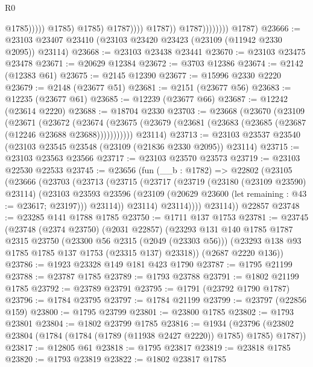 \begin{lexlean}{R0}
\begin{coremodule}
                                                @1785)))))
                                      @1785)
                                    @1785)
                                  @1787))))
                          @1787))
                      @1787))))))))
      @1787)
@23666 := @23103 @23407 @23410 (@23103 @23420 @23423 (@23109 (@11942 @2330 @2095)) @23114)
@23668 := @23103 @23438 @23441
@23670 := @23103 @23475 @23478
@23671 := @20629 @12384
@23672 := @3703 @12386
@23674 := @2142 (@12383 @61)
@23675 := @2145 @12390
@23677 := @15996 @2330 @2220
@23679 := @2148 (@23677 @51)
@23681 := @2151 (@23677 @56)
@23683 := @12235 (@23677 @61)
@23685 := @12239 (@23677 @66)
@23687 := @12242 (@23614 @2220)
@23688 := @18704 @2330
@23703 := @23668
    (@23670
      (@23109
        (@23671
          (@23672
            (@23674 (@23675 (@23679 (@23681 (@23683 (@23685 (@23687 (@12246 @23688 @23688)))))))))))
      @23114)
@23713 := @23103 @23537 @23540 (@23103 @23545 @23548 (@23109 (@21836 @2330 @2095)) @23114)
@23715 := @23103 @23563 @23566
@23717 := @23103 @23570 @23573
@23719 := @23103 @22530 @22533
@23745 := @23656
    (fun (__b : @1782) =>
    @22802
      (@23105
        (@23666
          (@23703
            (@23713
              (@23715
                (@23717
                  (@23719
                    (@23180 (@23109 @23590) @23114)
                    (@23103
                      @23593
                      @23596
                      (@23109 (@20629 @23600 (let remaining : @43 := @23617; @23197)))
                      @23114))
                  @23114)
                @23114))))
        @23114))
    @22857
@23748 := @23285 @141 @1788 @1785
@23750 := @1711 @137 @1753
@23781 := @23745
    (@23748
      (@2374 @23750)
      (@2031 @22857)
      (@23293
        @131
        @140
        @1785
        @1787
        @2315
        @23750
        (@23300 @56 @2315 (@2049 (@23303 @56)))
        (@23293 @138 @93 @1785 @1785 @137 @1753 (@23315 @137) @23318))
      (@2687 @2220 @136))
@23786 := @1923 @23328 @149 @181 @423 @1790
@23787 := @1795 @21199
@23788 := @23787 @1785
@23789 := @1793 @23788
@23791 := @1802 @21199 @1785
@23792 := @23789 @23791
@23795 := @1791 (@23792 @1790 @1787)
@23796 := @1784 @23795
@23797 := @1784 @21199
@23799 := @23797 (@22856 @159)
@23800 := @1795 @23799
@23801 := @23800 @1785
@23802 := @1793 @23801
@23804 := @1802 @23799 @1785
@23816 := @1934
    (@23796 (@23802 @23804 (@1784 (@1784 (@1789 (@11938 @2427 @2220)) @1785) @1785) @1787))
@23817 := @12805 @61
@23818 := @1795 @23817
@23819 := @23818 @1785
@23820 := @1793 @23819
@23822 := @1802 @23817 @1785

\end{coremodule}
\end{lexlean}
